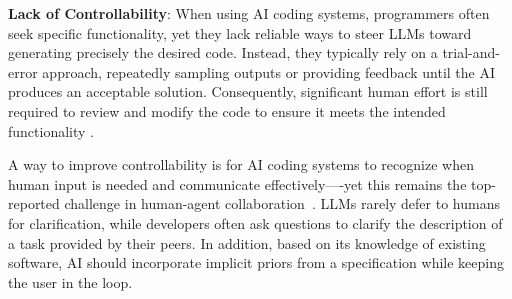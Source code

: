 
\textbf{Lack of Controllability}: When using AI coding systems, programmers often seek specific functionality, yet they lack reliable ways to steer LLMs toward generating precisely the desired code. Instead, they typically rely on a trial-and-error approach, repeatedly sampling outputs or providing feedback until the AI produces an acceptable solution. Consequently, significant human effort is still required to review and modify the code to ensure it meets the intended functionality \citep{weisz2024examining}.

A way to improve controllability is for AI coding systems to recognize when human input is needed and communicate effectively—-yet this remains the top-reported challenge in human-agent collaboration~\citep{shao2024collaborative}. LLMs rarely defer to humans for clarification, while developers often ask questions to clarify the description of a task provided by their peers. In addition, based on its knowledge of existing software, AI should incorporate implicit priors from a specification while keeping the user in the loop. 


